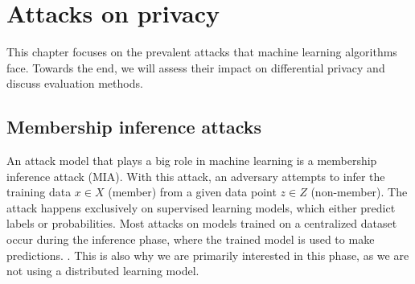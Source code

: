 \chapter{Attacks on privacy} \label{section: MIA}
This chapter focuses on the prevalent attacks that machine learning algorithms face. Towards the end, we will assess their impact on differential privacy and discuss evaluation methods.
\section{Membership inference attacks}
An attack model that plays a big role in machine learning is a membership inference attack (MIA).
With this attack, an adversary attempts to infer the training data $x \in X$ (member) from a given data point $z \in Z$ (non-member).
The attack happens exclusively on supervised learning models, which either predict labels or probabilities.
Most attacks on models trained on a centralized dataset occur during the inference phase, where the trained model is used to make predictions. \citep{rigaki_survey_2021}.
This is also why we are primarily interested in this phase, as we are not using a distributed learning model.


